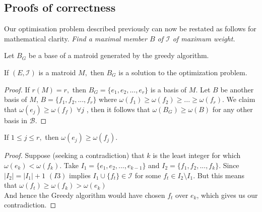 \documentclass[../main.tex]{subfiles}
\begin{document}
\subsection{Proofs of correctness}
Our optimisation problem described previously can now be restated as follows for mathematical clarity.
\noindent\Problem \textit{Find a maximal member $B$ of $\mathcal{I}$ of maximum weight.}
\begin{note}
Let $B_G$ be a base of a matroid generated by the greedy algorithm.
\end{note}
\begin{thm}
If $(E,\mathcal{I})$ is a matroid $M,$ then $B_G$ is a solution to the optimization problem.
\end{thm}
\begin{proof}
If $r(M) = r,$ then $B_G = \{e_1,e_2, ..., e_r\}$ is a basis of $M.$ Let $B$ be another basis of $M$, $B = \{f_1, f_2, ..., f_r\}$
where $\omega(f_1) \geq \omega(f_2) \geq ... \geq \omega(f_r).$ We claim that $\omega(e_j) \geq \omega(f_f)$ $ \forall j$ , then it follows that $\omega(B_G) \geq \omega(B)$ for any other basis in $\mathcal{B}.$
\end{proof}

\begin{lem}
If $1 \leq j \leq r,$ then $\omega(e_j) \geq \omega(f_j).$
\end{lem}
\begin{proof}
Suppose (seeking a contradiction) that $k$ is the least integer for which $\omega(e_k) < \omega(f_k).$ Take $I_1 = \{e_1, e_2, ..., e_{k-1}\}$ and $I_2 = \{f_1, f_2, ..., f_{k}\}.$ Since $|I_2| = |I_1|+1$  $(I3)$ implies $I_1 \cup \{f_t\} \in \mathcal{I}$ for some $f_t \in I_2 \setminus I_1.$ But this means that $\omega(f_t) \geq \omega(f_k) > \omega(e_k)$\\ And hence the Greedy algorithm would have chosen $f_t$ over $e_k$, which gives us our contradiction.
\end{proof}
\end{document}
